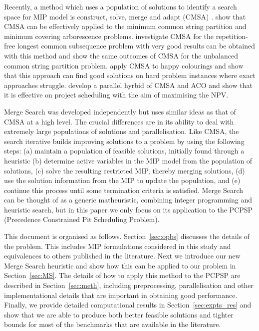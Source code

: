 \documentclass[journal]{IEEEtran}
\begin{document}
Recently, a method which uses a population of solutions to identify a search space for MIP model is construct, solve, merge and adapt (CMSA) \cite{Blum2016,BlumBlesa16,Blum16-2,Lewis2019,Thiruvady2019}. \cite{Blum2016} show that CMSA can be effectively applied to the minimum common string partition and minimum covering arborescence problems. \cite{BlumBlesa16} investigate CMSA for the repetition-free longest common subsequence problem with very good results can be obtained with this method and \cite{Blum16-2} show the same outcomes of CMSA for the unbalanced common string partition problem. \cite{Lewis2019} apply CMSA to happy colourings and show that this approach can find good solutions on hard problem instances where exact approaches struggle. \cite{Thiruvady2019} develop a parallel hyrbid of CMSA and ACO and show that it is effective on project scheduling with the aim of maximising the NPV.  

Merge Search was developed independently but uses similar ideas as that of CMSA at a high level. The crucial differences are in its ability to deal with extremely large populations of solutions and parallelisation. Like CMSA, the search iterative builds improving solutions to a problem by using the following steps: (a) maintain a population of feasible solutions, initially found through a heuristic (b) determine active variables in the MIP model from the population of solutions, (c) solve the resulting restricted MIP, thereby merging solutions, (d) use the solution information from the MIP to update the population, and (e) continue this process until some termination criteria is satisfied. Merge Search can be thought of as a generic matheuristic, combining integer programming and heuristic search,  but in this paper we only focus on its application to the PCPSP (Precedence Constrained Pit Scheduling Problem).

This document is organised as follows.  Section~\ref{sec:opbs} discusses the
details of the problem. This includes MIP formulations considered in this study and
equivalences to others published in the literature.  Next we introduce our new Merge Search heuristic and show how this can be applied to our problem in Section~\ref{sec:MS}. The details of how to apply this method to the PCPSP are described in Section~\ref{sec:meth}, including preprocessing, parallelisation and other implementational details that are important in obtaining good performance. Finally, we 
provide detailed computational results in Section~\ref{sec:expts_res} and show that we are able to produce both better feasible solutions and tighter bounds for most of the benchmarks that are available in the literature.
\end{document}
